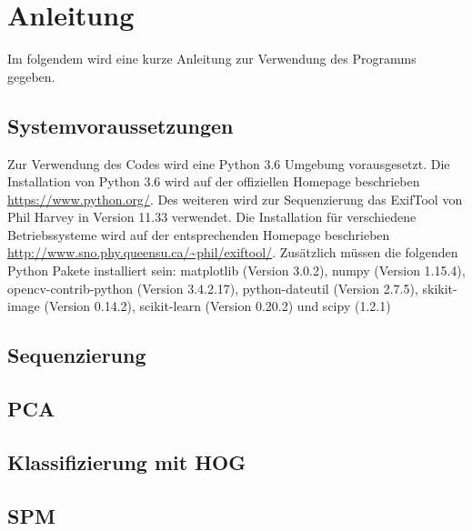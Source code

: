 \section*{Anleitung}
Im folgendem wird eine kurze Anleitung zur Verwendung des Programms gegeben.
\subsection*{Systemvoraussetzungen}
Zur Verwendung des Codes wird eine Python 3.6 Umgebung vorausgesetzt. Die Installation von Python 3.6 wird auf der offiziellen Homepage beschrieben \url{https://www.python.org/}. Des weiteren wird zur Sequenzierung das ExifTool von Phil Harvey in Version 11.33 verwendet. Die Installation für verschiedene Betriebssysteme wird auf der entsprechenden Homepage beschrieben \url{http://www.sno.phy.queensu.ca/~phil/exiftool/}. Zusätzlich müssen die folgenden Python Pakete installiert sein: matplotlib (Version 3.0.2), numpy (Version 1.15.4), opencv-contrib-python (Version 3.4.2.17), python-dateutil (Version 2.7.5), skikit-image (Version 0.14.2), scikit-learn (Version 0.20.2) und scipy (1.2.1)
\subsection*{Sequenzierung}
\subsection*{PCA}
\subsection*{Klassifizierung mit HOG}
\subsection*{SPM}




